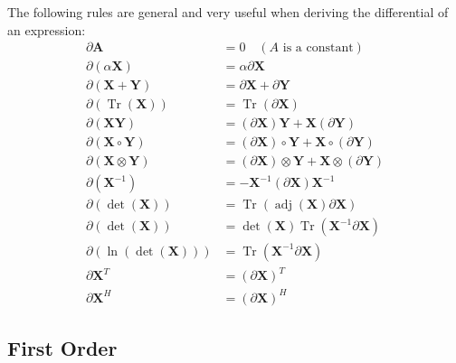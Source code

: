 \begin{theorem}
    The following rules are general and very useful when deriving the differential of an expression: 
$$
\begin{aligned}
\partial \mathbf{A} &=0 \quad(A\text{ is a constant}) \\
\partial(\alpha \mathbf{X}) &=\alpha \partial \mathbf{X} \\
\partial(\mathbf{X}+\mathbf{Y}) &=\partial \mathbf{X}+\partial \mathbf{Y} \\
\partial(\operatorname{Tr}(\mathbf{X})) &=\operatorname{Tr}(\partial \mathbf{X}) \\
\partial(\mathbf{X Y}) &=(\partial \mathbf{X}) \mathbf{Y}+\mathbf{X}(\partial \mathbf{Y}) \\
\partial(\mathbf{X} \circ \mathbf{Y}) &=(\partial \mathbf{X}) \circ \mathbf{Y}+\mathbf{X} \circ(\partial \mathbf{Y}) \\
\partial(\mathbf{X} \otimes \mathbf{Y}) &=(\partial \mathbf{X}) \otimes \mathbf{Y}+\mathbf{X} \otimes(\partial \mathbf{Y}) \\
\partial\left(\mathbf{X}^{-1}\right) &=-\mathbf{X}^{-1}(\partial \mathbf{X}) \mathbf{X}^{-1} \\
\partial(\operatorname{det}(\mathbf{X})) &=\operatorname{Tr}(\operatorname{adj}(\mathbf{X}) \partial \mathbf{X}) \\
\partial(\operatorname{det}(\mathbf{X})) &=\operatorname{det}(\mathbf{X}) \operatorname{Tr}\left(\mathbf{X}^{-1} \partial \mathbf{X}\right) \\
\partial(\ln (\operatorname{det}(\mathbf{X}))) &=\operatorname{Tr}\left(\mathbf{X}^{-1} \partial \mathbf{X}\right) \\
\partial \mathbf{X}^{T} &=(\partial \mathbf{X})^{T} \\
\partial \mathbf{X}^{H} &=(\partial \mathbf{X})^{H}
\end{aligned}
$$

\end{theorem}

\subsection{First Order}




